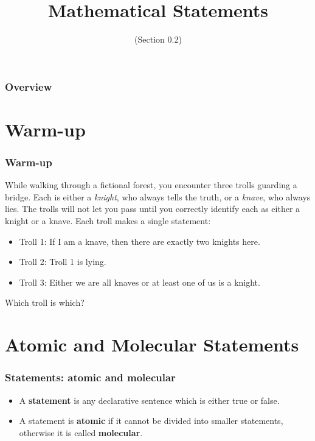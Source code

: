\documentclass[11pt, compress]{beamer}
\title{Mathematical Statements}
\subtitle{(Section 0.2)}
\author{}
\date{}
\newcommand{\terminology}[1]{\textbf{#1}}\newcommand{\lt}{<}
\begin{document}
\begin{frame}
\maketitle 
\end{frame}
 
\begin{frame}
\frametitle{Overview}
\tableofcontents 
\end{frame}
 

\section{Warm-up}
\begin{frame}
\frametitle{Warm-up}
 While walking through a fictional forest, you encounter three trolls guarding a bridge. Each is either a \emph{knight}, who always tells the truth, or a \emph{knave}, who always lies. The trolls will not let you pass until you correctly identify each as either a knight or a knave. Each troll makes a single statement:\begin{itemize}
\item{} Troll 1: If I am a knave, then there are exactly two knights here.


\item{} Troll 2: Troll 1 is lying.


\item{} Troll 3: Either we are all knaves or at least one of us is a knight.

\end{itemize}
Which troll is which?
\end{frame}
 


\section{Atomic and Molecular Statements}
\begin{frame}
\frametitle{Statements: atomic and molecular}
 \begin{itemize}
\item{} A \terminology{statement} is any declarative sentence which is either true or false.


\item{} A statement is \terminology{atomic} if it cannot be divided into smaller statements, otherwise it is called \terminology{molecular}.

\end{itemize}

\end{frame}
 
\end{document}
